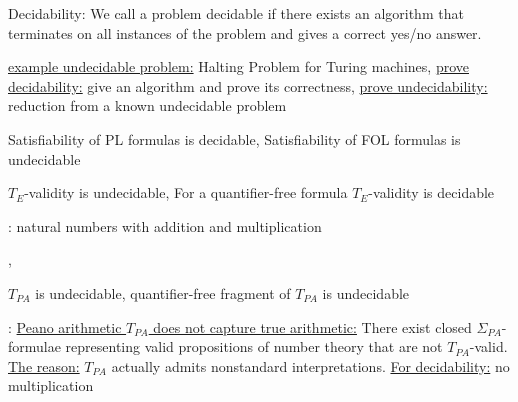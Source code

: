 \documentclass[landscape, a4paper]{article}
\begin{document}
\begin{minipage}[t]{0.2\linewidth}
\begin{betterlist}
		\item \alert{Decidability}: We call a problem \alert{decidable} if there exists an algorithm that terminates on all instances of the problem and gives a correct yes/no answer.
		\begin{betterlist}
			\item \uline{example undecidable problem:} Halting Problem for Turing machines, \uline{prove decidability:} give an algorithm and prove its correctness, \uline{prove undecidability:} reduction from a known undecidable problem
			\item \alert{Satisfiability} of PL formulas is \alert{decidable}, \alert{Satisfiability} of FOL formulas is \alert{undecidable}
			\item \alert{$T_{E}$-validity} is \alert{undecidable}, For a \alert{quantifier-free formula $T_E$-validity} is \alert{decidable}
			\item {}: natural numbers with addition and multiplication
			\begin{betterlist}
				\item {}, 
				\item \alert{$T_{PA}$} is \alert{undecidable}, \alert{quantifier-free fragment of $T_{PA}$} is \alert{undecidable}
				\item {}: \uline{Peano arithmetic $T_{PA}$ does not capture true arithmetic:} There exist closed $\Sigma_{PA}$-formulae representing valid propositions of number theory that are not $T_{PA}$-valid. \uline{The reason:} $T_{PA}$ actually admits nonstandard interpretations. \underline{For decidability:} \alert{no multiplication}
			\end{betterlist}


\end{betterlist}
\end{betterlist}
\end{minipage}
\end{document}
